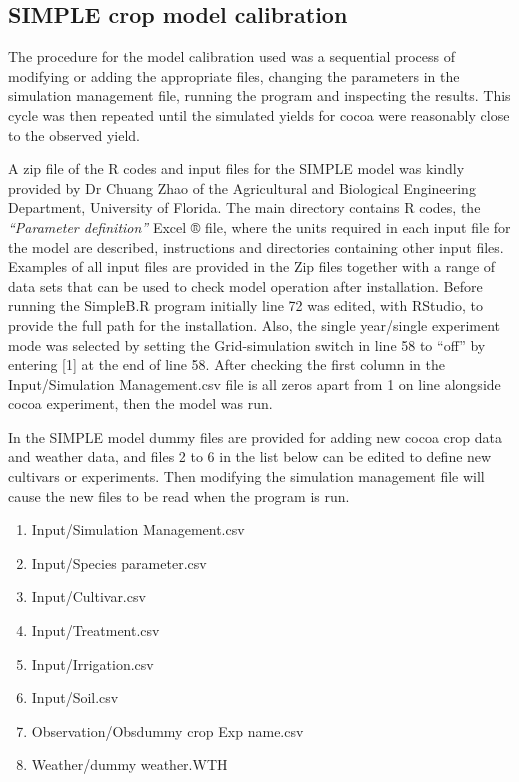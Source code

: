 \documentclass[gene,journal,article,submit,moreauthors,pdftex]{Definitions/mdpi}
\begin{document}
\subsection{SIMPLE crop model calibration}

The procedure for the model calibration used was a sequential process of modifying or adding the appropriate files, changing the parameters in the simulation management file, running the program and inspecting the results. This cycle was then repeated until the  simulated yields for cocoa were reasonably close to the observed yield.

A zip file of the R codes and input files for the SIMPLE model was kindly provided by Dr Chuang Zhao of the Agricultural and Biological Engineering Department, University of Florida. The main directory contains R codes, the \emph{“Parameter definition”} Excel ® file, where the units required in each input file for the model are described, instructions and directories containing other input files. Examples of all input files are provided in the Zip files together with a range of data sets that can be used to check model operation after installation. Before running the SimpleB.R program initially line 72 was edited, with RStudio, to provide the full path for the installation. Also, the single year/single experiment mode was selected by setting the Grid-simulation switch in line 58 to “off” by entering [1] at the end of line 58. After checking the first column in the Input/Simulation Management.csv file is all zeros apart from 1 on line alongside cocoa experiment, then the model was run.

In the SIMPLE model dummy files are provided for adding new cocoa crop data and weather data, and files 2 to 6 in the list below can be edited to define new cultivars or experiments. Then modifying the simulation management file will cause the new files to be read when the program is run.
\begin{enumerate}
	\item Input/Simulation Management.csv
	\item Input/Species parameter.csv
	\item Input/Cultivar.csv
    \item Input/Treatment.csv	
    \item Input/Irrigation.csv
    \item Input/Soil.csv
    \item Observation/Obsdummy crop Exp name.csv	
    \item Weather/dummy weather.WTH
\end{enumerate}
\end{document}
